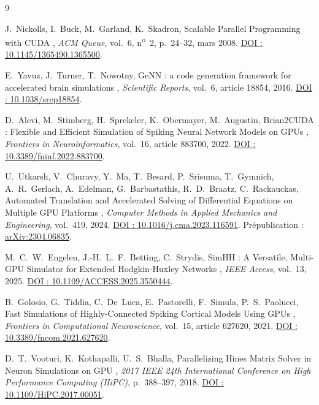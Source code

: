 \begin{thebibliography}{9}

 J.~Nickolls, I.~Buck, M.~Garland, K.~Skadron, \og Scalable Parallel Programming with CUDA \fg, \emph{ACM Queue}, vol.~6, n\textsuperscript{o}~2, p.~24--32, mars 2008. \href{https://doi.org/10.1145/1365490.1365500}{DOI : 10.1145/1365490.1365500}.

 E.~Yavuz, J.~Turner, T.~Nowotny, \og GeNN : a code generation framework for accelerated brain simulations \fg, \emph{Scientific Reports}, vol.~6, article 18854, 2016. \href{https://doi.org/10.1038/srep18854}{DOI : 10.1038/srep18854}.

 D.~Alevi, M.~Stimberg, H.~Sprekeler, K.~Obermayer, M.~Augustin, \og Brian2CUDA : Flexible and Efficient Simulation of Spiking Neural Network Models on GPUs \fg, \emph{Frontiers in Neuroinformatics}, vol.~16, article 883700, 2022. \href{https://doi.org/10.3389/fninf.2022.883700}{DOI : 10.3389/fninf.2022.883700}.

 U.~Utkarsh, V.~Churavy, Y.~Ma, T.~Besard, P.~Srisuma, T.~Gymnich, A.~R.~Gerlach, A.~Edelman, G.~Barbastathis, R.~D.~Braatz, C.~Rackauckas, \og Automated Translation and Accelerated Solving of Differential Equations on Multiple GPU Platforms \fg, \emph{Computer Methods in Applied Mechanics and Engineering}, vol.~419, 2024. \href{https://doi.org/10.1016/j.cma.2023.116591}{DOI : 10.1016/j.cma.2023.116591}. Prépublication : \href{https://arxiv.org/abs/2304.06835}{arXiv:2304.06835}.

 M.~C.~W.~Engelen, J.-H.~L.~F.~Betting, C.~Strydis, \og SimHH : A Versatile, Multi-GPU Simulator for Extended Hodgkin-Huxley Networks \fg, \emph{IEEE Access}, vol.~13, 2025. \href{https://doi.org/10.1109/ACCESS.2025.3550444}{DOI : 10.1109/ACCESS.2025.3550444}.

 B.~Golosio, G.~Tiddia, C.~De~Luca, E.~Pastorelli, F.~Simula, P.~S.~Paolucci, \og Fast Simulations of Highly-Connected Spiking Cortical Models Using GPUs \fg, \emph{Frontiers in Computational Neuroscience}, vol.~15, article 627620, 2021. \href{https://doi.org/10.3389/fncom.2021.627620}{DOI : 10.3389/fncom.2021.627620}.

 D.~T.~Vooturi, K.~Kothapalli, U.~S.~Bhalla, \og Parallelizing Hines Matrix Solver in Neuron Simulations on GPU \fg, \emph{2017 IEEE 24th International Conference on High Performance Computing (HiPC)}, p.~388--397, 2018. \href{https://doi.org/10.1109/HiPC.2017.00051}{DOI : 10.1109/HiPC.2017.00051}.


\end{thebibliography}

